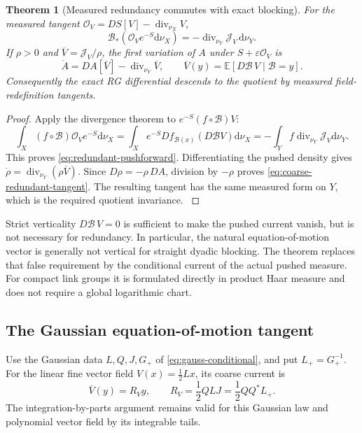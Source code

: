 \documentclass[11pt,oneside,openany]{book}
\newtheorem{theorem}{Theorem}[chapter]
\theoremstyle{definition}
\theoremstyle{remark}
\newcommand{\E}{\mathbb E}
\newcommand{\dd}{\mathrm d}
\newcommand{\src}[2]{\cite[#2]{#1}}
\begin{document}
\begin{theorem}[Measured redundancy commutes with exact blocking]
\label{thm:measured-redundancy}
For the measured tangent
$\mathcal O_V=DS[V]-\operatorname{div}_{\nu_X}V$,
\begin{equation}\label{eq:redundant-pushforward}
\mathcal B_*(\mathcal O_Ve^{-S}\dd\nu_X)
=-\operatorname{div}_{\nu_Y}\mathcal J_V\,\dd\nu_Y.
\end{equation}
If $\rho>0$ and $\overline V=\mathcal J_V/\rho$, the first variation of
$A$ under $S+\varepsilon\mathcal O_V$ is
\begin{equation}\label{eq:coarse-redundant-tangent}
\dot A=DA[\overline V]-\operatorname{div}_{\nu_Y}\overline V,
\qquad
\overline V(y)=\E[D\mathcal B\,V\mid\mathcal B=y].
\end{equation}
Consequently the exact RG differential descends to the quotient by
measured field-redefinition tangents.
\end{theorem}
\begin{proof}
Apply the divergence theorem to $e^{-S}(f\circ\mathcal B)V$:
\[
\int_X(f\circ\mathcal B)\mathcal O_Ve^{-S}\dd\nu_X
=\int_Xe^{-S}Df_{\mathcal B(x)}(D\mathcal B V)\dd\nu_X
=-\int_Y f\operatorname{div}_{\nu_Y}\mathcal J_V\dd\nu_Y.
\]
This proves \cref{eq:redundant-pushforward}. Differentiating the pushed
density gives $\dot\rho=\operatorname{div}_{\nu_Y}(\rho\overline V)$.
Since $D\rho=-\rho\,DA$, division by $-\rho$ proves
\cref{eq:coarse-redundant-tangent}. The resulting tangent has the same
measured form on $Y$, which is the required quotient invariance.
\src{F8}{V58}
\end{proof}

Strict verticality $D\mathcal B\,V=0$ is sufficient to make the pushed
current vanish, but is not necessary for redundancy. In particular,
the natural equation-of-motion vector is generally not vertical for
straight dyadic blocking. The theorem replaces that false requirement
by the conditional current of the actual pushed measure. For compact
link groups it is formulated directly in product Haar measure and does
not require a global logarithmic chart.

\subsection{The Gaussian equation-of-motion tangent}
Use the Gaussian data $L,Q,J,G_+$ of
\cref{eq:gauss-conditional}, and put $L_+=G_+^{-1}$. For the linear
fine vector field $V(x)=\tfrac12Lx$, its coarse current is
\begin{equation}\label{eq:Gaussian-coarse-velocity}
\overline V(y)=R_Vy,
\qquad R_V=\frac12QLJ=\frac12QQ^*L_+.
\end{equation}
The integration-by-parts argument remains valid for this Gaussian
law and polynomial vector field by its integrable tails.
\end{document}
